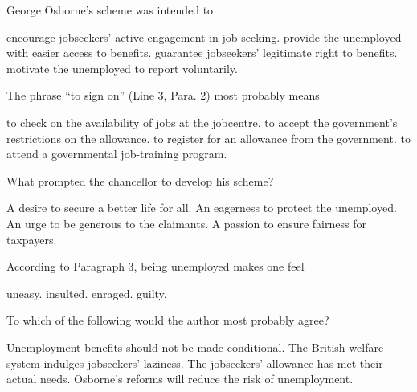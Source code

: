 \item George Osborne's scheme was intended to
\begin{tasks}
	\task encourage jobseekers' active engagement in job seeking.
	\task provide the unemployed with easier access to benefits.
	\task guarantee jobseekers' legitimate right to benefits.
	\task motivate the unemployed to report voluntarily.
\end{tasks}
\item The phrase ``to sign on'' (Line 3, Para. 2) most probably means
\begin{tasks}
	\task to check on the availability of jobs at the jobcentre.
	\task to accept the government's restrictions on the allowance.
	\task to register for an allowance from the government.
	\task to attend a governmental job-training program.
\end{tasks}
\item What prompted the chancellor to develop his scheme?
\begin{tasks}
	\task A desire to secure a better life for all.
	\task An eagerness to protect the unemployed.
	\task An urge to be generous to the claimants.
	\task A passion to ensure fairness for taxpayers.
\end{tasks}
\item According to Paragraph 3, being unemployed makes one feel
\begin{tasks}
	\task uneasy.
	\task insulted.
	\task enraged.
	\task guilty.
\end{tasks}
\item To which of the following would the author most probably agree?
\begin{tasks}
	\task Unemployment benefits should not be made conditional.
	\task The British welfare system indulges jobseekers' laziness.
	\task The jobseekers' allowance has met their actual needs.
	\task Osborne's reforms will reduce the risk of unemployment.
\end{tasks}
